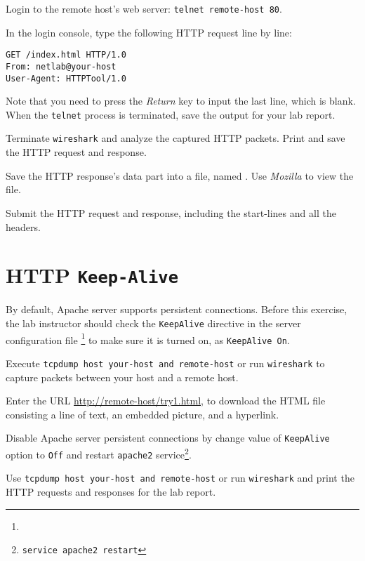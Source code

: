 \documentclass{../UTNetLab}
\begin{document}
    Login to the remote host’s web server: \lstinline[emph={your-host, remote-host}]{telnet remote-host 80}.

    In the login console, type the following HTTP request line by line:
    \begin{lstlisting}[language={HTTP},escapechar={},emph={your-host, remote-host}]
GET /index.html HTTP/1.0
From: netlab@your-host
User-Agent: HTTPTool/1.0

    \end{lstlisting}
    Note that you need to press the \textit{Return} key to input the last line, which is blank.
    When the \lstinline{telnet} process is terminated, save the output for your lab report.

    Terminate \lstinline{wireshark} and analyze the captured HTTP packets.
    Print and save the HTTP request and response.

    Save the HTTP response’s data part into a file, named .
    Use \textit{Mozilla} to view the file.
    
    \begin{report}
    \item Submit the HTTP request and response, including the start-lines and all the headers.
    \end{report}

    
\section{HTTP \texttt{Keep-Alive}}
    By default, Apache server supports persistent connections.
    Before this exercise, the lab instructor should check the \texttt{KeepAlive} directive in the server configuration file \footnote{} to make sure it is turned on, as \lstinline[language={HTTP}]{KeepAlive On}.

    Execute \lstinline[emph={your-host, remote-host}]{tcpdump host your-host and remote-host} or run \lstinline{wireshark} to capture packets between your host and a remote host.

    
    Enter the URL \url{http://remote-host/try1.html}, to download the HTML file consisting a line of text, an embedded picture, and a hyperlink.


    Disable Apache server persistent connections by change value of \texttt{KeepAlive} option to \lstinline{Off} and restart \lstinline{apache2} service\footnote{\lstinline{service apache2 restart}}.

    
    Use \lstinline[emph={your-host, remote-host}]{tcpdump host your-host and remote-host} or run \lstinline{wireshark} and print the HTTP requests and responses for the lab report.
    
\end{document}
